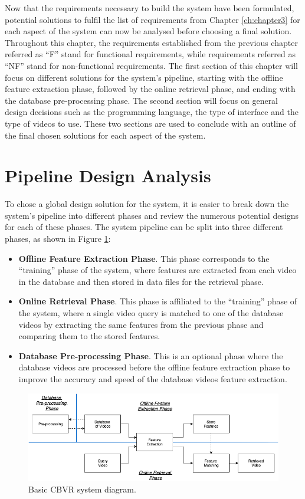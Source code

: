 Now that the requirements necessary to build the system have been formulated, potential solutions to fulfil the list of requirements from Chapter \ref{ch:chapter3} for each aspect of the system can now be analysed before choosing a final solution. Throughout this chapter, the requirements established from the previous chapter referred as ``F'' stand for functional requirements, while requirements referred as ``NF'' stand for non-functional requirements. The first section of this chapter will focus on different solutions for the system's pipeline, starting with the offline feature extraction phase, followed by the online retrieval phase, and ending with the database pre-processing phase. The second section will focus on general design decisions such as the programming language, the type of interface and the type of videos to use. These two sections are used to conclude with an outline of the final chosen solutions for each aspect of the system.

\section{Pipeline Design Analysis}

To chose a global design solution for the system, it is easier to break down the system's pipeline into different phases and review the numerous potential designs for each of these phases. The system pipeline can be split into three different phases, as shown in Figure \ref{fig:basic-cbvr-diagram}:

\begin{itemize}
    \item \textbf{Offline Feature Extraction Phase}. This phase corresponds to the ``training'' phase of the system, where features are extracted from each video in the database and then stored in data files for the retrieval phase.
    \item \textbf{Online Retrieval Phase}. This phase is affiliated to the ``training'' phase of the system, where a single video query is matched to one of the database videos by extracting the same features from the previous phase and comparing them to the stored features.
    \item \textbf{Database Pre-processing Phase}. This is an optional phase where the database videos are processed before the offline feature extraction phase to improve the accuracy and speed of the database videos feature extraction.
\end{itemize}

\begin{figure}[h]
\centerline{\includegraphics[width=\textwidth]{figures/design/basic_cbvr_phases.png}}
\caption{\label{fig:basic-cbvr-diagram}Basic CBVR system diagram.}
\end{figure}

